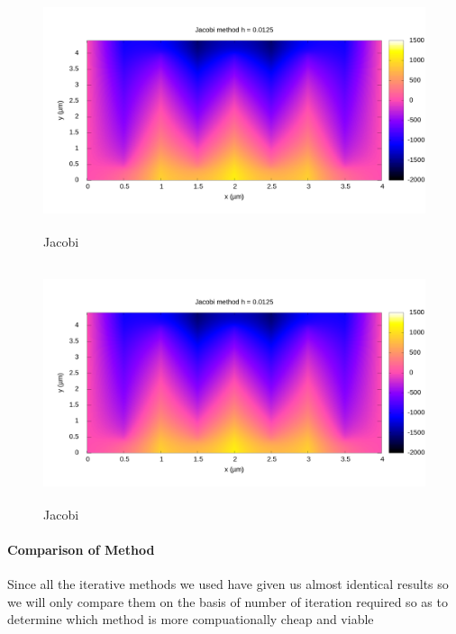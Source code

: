 \begin{figure}[ht]
    \centering
    \includegraphics[height= 70mm]{content/graphs/Jacobi_0125_map.png}
    \caption{Jacobi}
    \label{fig2:}
\end{figure}%
\begin{figure}[ht]
    \centering
    \includegraphics[height= 70mm]{content/graphs/Jacobi_0125_map.png}
    \caption{Jacobi}
    \label{fig3:}
\end{figure}%

\paragraph{Comparison of Method}{%
Since all the iterative methods we used have given us almost identical results so we will only compare them on the basis of number of iteration required so as to determine which method is more compuationally cheap and viable}
    
